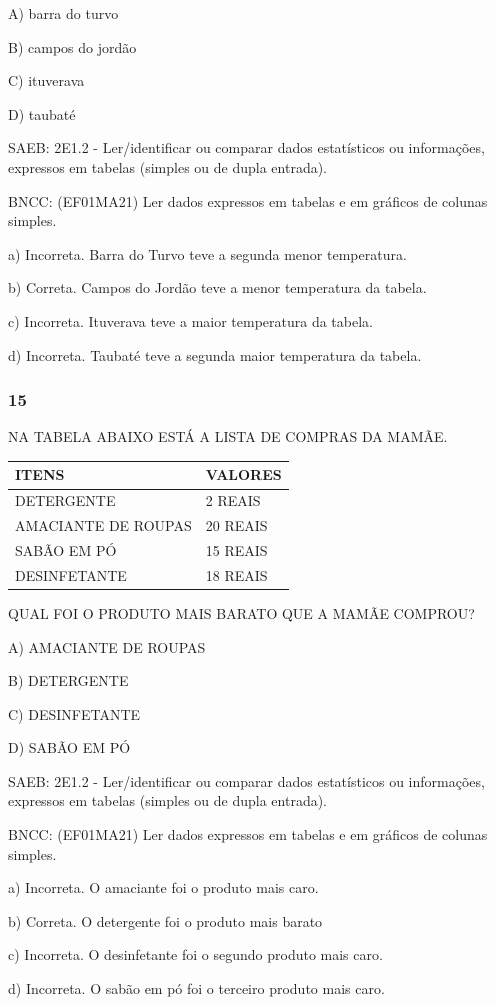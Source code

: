 A) barra do turvo

B) campos do jordão

C) ituverava

D) taubaté

SAEB: 2E1.2 - Ler/identificar ou comparar dados estatísticos ou
informações, expressos em tabelas (simples ou de dupla entrada).

BNCC: (EF01MA21) Ler dados expressos em tabelas e em gráficos de colunas
simples.

a) Incorreta. Barra do Turvo teve a segunda menor temperatura.

b) Correta. Campos do Jordão teve a menor temperatura da tabela.

c) Incorreta. Ituverava teve a maior temperatura da tabela.

d) Incorreta. Taubaté teve a segunda maior temperatura da tabela.

\subsubsection{15}\label{section-101}

NA TABELA ABAIXO ESTÁ A LISTA DE COMPRAS DA MAMÃE.

\begin{longtable}[]{@{}ll@{}}
\toprule
ITENS & VALORES\tabularnewline
\midrule
\endhead
DETERGENTE & 2 REAIS\tabularnewline
AMACIANTE DE ROUPAS & 20 REAIS\tabularnewline
SABÃO EM PÓ & 15 REAIS\tabularnewline
DESINFETANTE & 18 REAIS\tabularnewline
\bottomrule
\end{longtable}

QUAL FOI O PRODUTO MAIS BARATO QUE A MAMÃE COMPROU?

A) AMACIANTE DE ROUPAS

B) DETERGENTE

C) DESINFETANTE

D) SABÃO EM PÓ

SAEB: 2E1.2 - Ler/identificar ou comparar dados estatísticos ou
informações, expressos em tabelas (simples ou de dupla entrada).

BNCC: (EF01MA21) Ler dados expressos em tabelas e em gráficos de colunas
simples.

a) Incorreta. O amaciante foi o produto mais caro.

b) Correta. O detergente foi o produto mais barato

c) Incorreta. O desinfetante foi o segundo produto mais caro.

d) Incorreta. O sabão em pó foi o terceiro produto mais caro.

